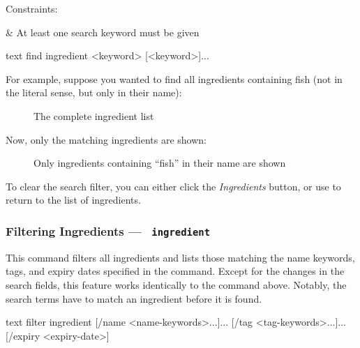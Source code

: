 	Constraints:
	\begin{romanlist}
		& At least one search keyword must be given
	\end{romanlist}

	 \begin{blockofcode}{text}
		find ingredient
			<keyword>
			[<keyword>]...
	\end{blockofcode}

	For example, suppose you wanted to find all ingredients containing fish (not in the literal sense, but only in their name):

	\begin{figure}[!htbp]\centering\ContinuedFloat*
		\caption{The complete ingredient list}
	\end{figure}

	\pagebreak
	Now, only the matching ingredients are shown:

	\begin{figure}[!htbp]\centering\ContinuedFloat
		\caption{Only ingredients containing \enquote{fish} in their name are shown}
	\end{figure}

	To clear the search filter, you can either click the \emph{Ingredients} button, or use  to return
	to the list of ingredients.






\hypertarget{FilterIngredientCommand}{}
\subsubsection{Filtering Ingredients — \texttt{ ingredient}}

	This command filters all ingredients and lists those matching the name keywords, tags, and expiry dates specified in the command.
	Except for the changes in the search fields, this feature works identically to the
	\hyperlink{FilterRecipeCommand}{} command above. Notably,  the search terms have to match an
	ingredient before it is found.

	 \begin{blockofcode}{text}
		filter ingredient
			[/name <name-keywords>...]...
			[/tag <tag-keywords>...]...
			[/expiry <expiry-date>]
	\end{blockofcode}

